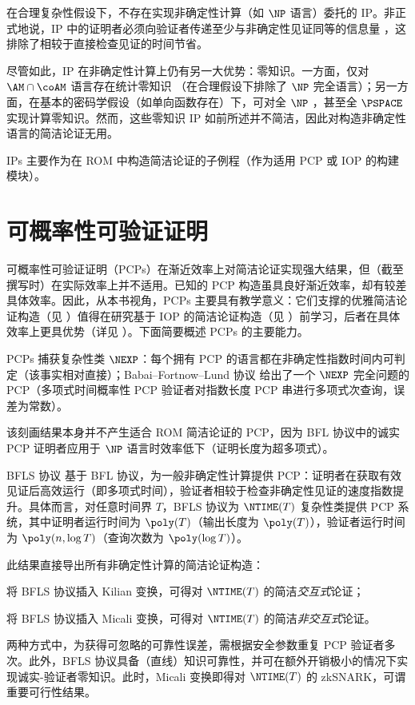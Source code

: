 \documentclass[american,singlepageview]{snargs-book-zh}
\begin{document}
在合理复杂性假设下，不存在实现非确定性计算（如 $\NP$ 语言）委托的 IP。非正式地说，IP 中的证明者必须向验证者传递至少与非确定性见证同等的信息量 \cite{GoldreichH98,GoldreichVW02}，这排除了相较于直接检查见证的时间节省。

尽管如此，IP 在非确定性计算上仍有另一大优势：零知识。一方面，仅对 $\AM\cap\coAM$ 语言存在统计零知识 \cite{Fortnow89,AielloH87}（在合理假设下排除了 $\NP$ 完全语言）；另一方面，在基本的密码学假设（如单向函数存在）下，可对全 $\NP$ \cite{GoldreichMW91}，甚至全 $\PSPACE$ \cite{BenOrGGHKMR88} 实现计算零知识。然而，这些零知识 IP 如前所述并不简洁，因此对构造非确定性语言的简洁论证无用。

IPs 主要作为在 ROM 中构造简洁论证的子例程（作为适用 PCP 或 IOP 的构建模块）。

\section{可概率性可验证证明}
\label{section:known-pcps}

可概率性可验证证明（PCPs）在渐近效率上对简洁论证实现强大结果，但（截至撰写时）在实际效率上并不适用。已知的 PCP 构造虽具良好渐近效率，却有较差具体效率。因此，从本书视角，PCPs 主要具有教学意义：它们支撑的优雅简洁论证构造（见 ）值得在研究基于 IOP 的简洁论证构造（见 ）前学习，后者在具体效率上更具优势（详见 ）。下面简要概述 PCPs 的主要能力。

PCPs 捕获复杂性类 $\NEXP$：每个拥有 PCP 的语言都在非确定性指数时间内可判定（该事实相对直接）；Babai--Fortnow--Lund 协议 \cite{BabaiFL91} 给出了一个 $\NEXP$ 完全问题的 PCP（多项式时间概率性 PCP 验证者对指数长度 PCP 串进行多项式次查询，误差为常数）。

该刻画结果本身并不产生适合 ROM 简洁论证的 PCP，因为 BFL 协议中的诚实 PCP 证明者应用于 $\NP$ 语言时效率低下（证明长度为超多项式）。

BFLS 协议 \cite{BabaiFLS91} 基于 BFL 协议，为一般非确定性计算提供 PCP：证明者在获取有效见证后高效运行（即多项式时间），验证者相较于检查非确定性见证的速度指数提升。具体而言，对任意时间界 $T$，BFLS 协议为 $\NTIME(T)$ 复杂性类提供 PCP 系统，其中证明者运行时间为 $\poly(T)$（输出长度为 $\poly(T)$），验证者运行时间为 $\poly(n,\log T)$（查询次数为 $\poly(\log T)$）。

此结果直接导出所有非确定性计算的简洁论证构造：
\begin{inparaenum}[(a)]
  \item 将 BFLS 协议插入 Kilian 变换，可得对 $\NTIME(T)$ 的简洁\emph{交互式}论证；
  \item 将 BFLS 协议插入 Micali 变换，可得对 $\NTIME(T)$ 的简洁\emph{非交互式}论证。
\end{inparaenum}
两种方式中，为获得可忽略的可靠性误差，需根据安全参数重复 PCP 验证者多次。此外，BFLS 协议具备（直线）知识可靠性，并可在额外开销极小的情况下实现诚实-验证者零知识。此时，Micali 变换即得对 $\NTIME(T)$ 的 zkSNARK，可谓重要可行性结果。
\end{document}
